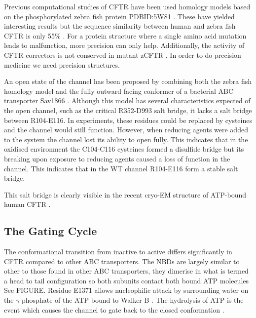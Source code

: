 
Previous computational studies of CFTR have been used homology models based on the phosphorylated zebra fish protein PDBID:5W81 \cite{zhang2017a}. These have yielded interesting results but the sequence similarity between human and zebra fish CFTR is only 55\% \cite{}. For a protein structure where a single amino acid mutation leads to malfunction, more precision can only help. Additionally, the activity of CFTR correctors is not conserved in mutant zCFTR \cite{laselva2019}. In order to do precision medicine we need precision structures. 

An open state of the channel has been proposed by combining both the zebra fish homology model and the fully outward facing conformer of a bacterial ABC transporter Sav1866 \cite{Hoffmann2018}. Although this model has several characteristics expected of the open channel, such as the critical R352-D993 salt bridge, it lacks a salt bridge between R104-E116. In experiments, these residues could be replaced by cysteines and the channel would still function. However, when reducing agents were added to the system the channel lost its ability to open fully. This indicates that in the oxidised environment the C104-C116 cysteines formed a disulfide bridge but its breaking upon exposure to reducing agents caused a loss of function in the channel. This indicates that in the WT channel R104-E116 form a stable salt bridge. 

This salt bridge is clearly visible in the recent cryo-EM structure of ATP-bound human CFTR \cite{zhang2018}.

\subsection{The Gating Cycle}
The conformational transition from inactive to active differs significantly in CFTR compared to other ABC transporters. The NBDs are largely similar to other to those found in other ABC transporters, they dimerise in what is termed a head to tail configuration so both subunits contact both bound ATP molecules \cite{} See FIGURE. Residue E1371 allows nucleophilic attack by surrounding water on the $\gamma$ phosphate  of the ATP bound to Walker B \cite{Stratford2007}. The hydrolysis of ATP is the event which causes the channel to gate back to the closed conformation \cite{}. 

